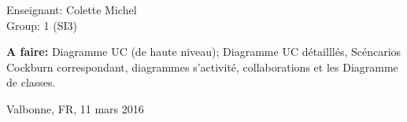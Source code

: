 \begin{titlepage}
\begin{center}
\vfill

\normalsize

Enseignant: Colette Michel\\
Group: 1 (SI3)

\vfill

\hfill
\parbox{0.5\linewidth}{\textbf{
A faire:} Diagramme UC (de haute niveau); Diagramme UC détailllés, Scéncarios Cockburn correspondant, diagrammes s'activité, collaborations et les Diagramme de classes.}


\vfill

\large

Valbonne, FR, 11 mars 2016

\end{center}

\end{titlepage}
